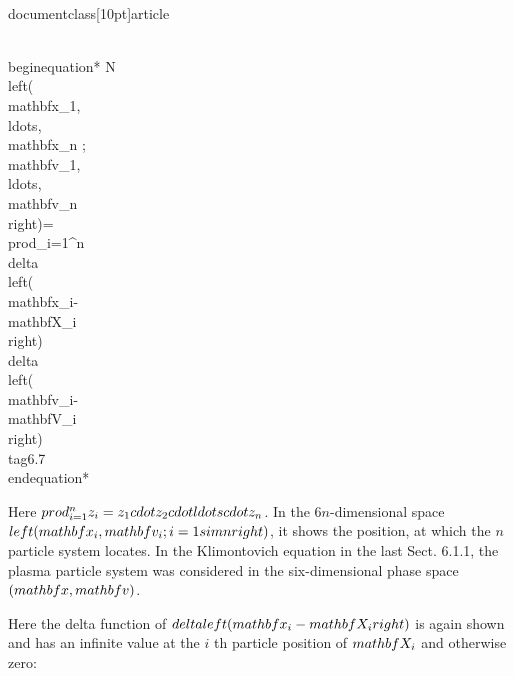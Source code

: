\\documentclass[10pt]{article}
\begin{document}
{{{{\\begin{equation*}
N\\left(\\mathbf{x}_{1}, \\ldots, \\mathbf{x}_{n} ; \\mathbf{v}_{1}, \\ldots, \\mathbf{v}_{n}\\right)=\\prod_{i=1}^{n} \\delta\\left(\\mathbf{x}_{i}-\\mathbf{X}_{i}\\right) \\delta\\left(\\mathbf{v}_{i}-\\mathbf{V}_{i}\\right) \\tag{6.7}
\\end{equation*}


Here $\\prod_{i=1}^{n} z_{i}=z_{1} \\cdot z_{2} \\cdot \\ldots \\cdot z_{n}$. In the $6 n$-dimensional space $\\left(\\mathbf{x}_{i}, \\mathbf{v}_{i} ; i=1 \\sim n\\right)$, it shows the position, at which the $n$ particle system locates. In the Klimontovich equation in the last Sect. 6.1.1, the plasma particle system was considered in the six-dimensional phase space $(\\mathbf{x}, \\mathbf{v})$.

Here the delta function of $\\delta\\left(\\mathbf{x}_{i}-\\mathbf{X}_{i}\\right)$ is again shown and has an infinite value at the $i$ th particle position of $\\mathbf{X}_{i}$ and otherwise zero:

}}}}
\end{document}
